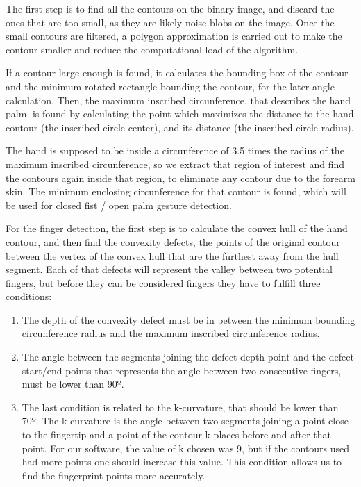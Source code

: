 The first step is to find all the contours on the binary image, and discard the ones that are too small, as they are likely noise blobs on the image. Once the small contours are filtered, a polygon approximation is carried out to make the contour smaller and reduce the computational load of the algorithm.

If a contour large enough is found, it calculates the bounding box of the contour and the minimum rotated rectangle bounding the contour, for the later angle calculation. Then, the maximum inscribed circunference, that describes the hand palm, is found by calculating the point which maximizes the distance to the hand contour (the inscribed circle center), and its distance (the inscribed circle radius).

The hand is supposed to be inside a circunference of 3.5 times the radius of the maximum inscribed circunference, so we extract that region of interest and find the contours again inside that region, to eliminate any contour due to the forearm skin. The minimum enclosing circunference for that contour is found, which will be used for closed fist / open palm gesture detection.

For the finger detection, the first step is to calculate the convex hull of the hand contour, and then find the convexity defects, the points of the original contour between the vertex of the convex hull that are the furthest away from the hull segment. Each of that defects will represent the valley between two potential fingers, but before they can be considered fingers they have to fulfill three conditions:

\begin{enumerate}
\item The depth of the convexity defect must be in between the minimum bounding circunference radius and the maximum inscribed circunference radius. 
\item The angle between the segments joining the defect depth point and the defect start/end points that represents the angle between two consecutive fingers, must be lower than 90º.
\item The last condition is related to the k-curvature, that should be lower than 70º. The k-curvature is the angle between two segments joining a point close to the fingertip and a point of the contour k places before and after that point. For our software, the value of k chosen was 9, but if the contours used had more points one should increase this value. This condition allows us to find the fingerprint points more accurately.
\end{enumerate}

